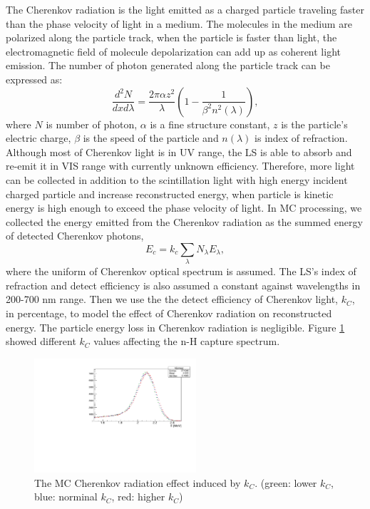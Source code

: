 The Cherenkov radiation is the light emitted as a charged particle traveling faster than the phase velocity of light in a medium. 
The molecules in the medium are polarized along the particle track, when the particle is faster than light, the electromagnetic field of molecule depolarization can add up as coherent light emission. 
The number of photon generated along the particle track can be expressed as:
\begin{equation}
    \frac{d^2N}{dxd\lambda} = \frac{2\pi\alpha z^2}{\lambda}\left(1- \frac{1}{\beta^2n^2(\lambda)}\right),
\end{equation}
where $N$ is number of photon, $\alpha$ is a fine structure constant, $z$ is the particle's electric charge, $\beta$ is the speed of the particle and $n(\lambda)$ is index of refraction.
Although most of Cherenkov light is in UV range, the LS is able to absorb and re-emit it in VIS range with currently unknown efficiency.
Therefore, more light can be collected in addition to the scintillation light with high energy incident charged particle and increase reconstructed energy, when particle is kinetic energy is high enough to exceed the phase velocity of light.
In MC processing, we collected the energy emitted from the Cherenkov radiation as the summed energy of detected Cherenkov photons,
\begin{equation}\label{eq:ceren2}
E_{c} = k_{c}\sum_{\lambda}N_\lambda E_\lambda,
\end{equation}
where the uniform of Cherenkov optical spectrum is assumed.
The LS's index of refraction and detect efficiency is also assumed a constant against wavelengths in 200-700 nm range.
Then we use the the detect efficiency of Cherenkov light, $k_{C}$, in percentage, to model the effect of Cherenkov radiation on reconstructed energy. 
The particle energy loss in Cherenkov radiation is negligible.
Figure \ref{fig:kcplot} showed different $k_{C}$ values affecting the n-H capture spectrum.

\begin{figure}[h!]
\centering
\includegraphics[width=60mm]{Figures/kc.pdf}
\caption{The MC Cherenkov radiation effect induced by $k_{C}$. (green: lower $k_{C}$, blue: norminal $k_{C}$, red: higher $k_{C}$)}
\label{fig:kcplot}
\end{figure}

